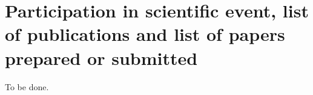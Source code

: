 \documentclass[letterpaper,10pt,english]{jupyterBook}
\begin{document}
\sphinxstepscope


\chapter{Participation in scientific event, list of publications and list of papers prepared or submitted}
\label{\detokenize{Participation_in_scientific_event,_list_of_publications_and_list_of_papers_prepared_or_submitted:participation-in-scientific-event-list-of-publications-and-list-of-papers-prepared-or-submitted}}\label{\detokenize{Participation_in_scientific_event,_list_of_publications_and_list_of_papers_prepared_or_submitted::doc}}
\sphinxAtStartPar
To be done.







\renewcommand{\indexname}{Index}
\printindex
\end{document}
